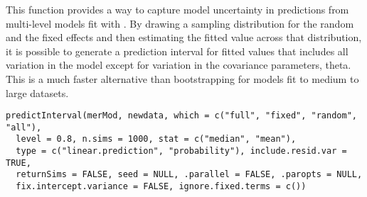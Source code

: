 \documentclass[letterpaper]{book}
\begin{document}
%
\begin{Description}\relax
This function provides a way to capture model uncertainty in
predictions from multi-level models fit with . By drawing a sampling
distribution for the random and the fixed effects and then estimating the fitted
value across that distribution, it is possible to generate a prediction interval
for fitted values that includes all variation in the model except for variation
in the covariance parameters, theta. This is a much faster alternative than
bootstrapping for models fit to medium to large datasets.
\end{Description}
%
\begin{Usage}
\begin{verbatim}
predictInterval(merMod, newdata, which = c("full", "fixed", "random", "all"),
  level = 0.8, n.sims = 1000, stat = c("median", "mean"),
  type = c("linear.prediction", "probability"), include.resid.var = TRUE,
  returnSims = FALSE, seed = NULL, .parallel = FALSE, .paropts = NULL,
  fix.intercept.variance = FALSE, ignore.fixed.terms = c())
\end{verbatim}
\end{Usage}
%
\end{document}
